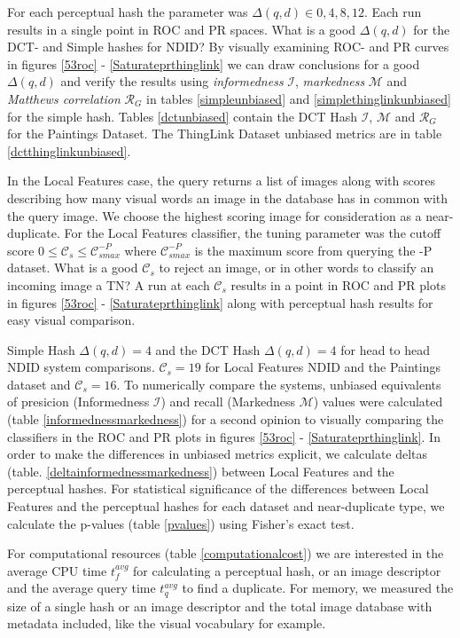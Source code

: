 \documentclass[english,12pt,a4paper,pdftex,elec,utf8, table]{aaltothesis}
\begin{document}
For each perceptual hash the parameter was $\Delta(q,d) \in {0,4,8,12}$. Each run results in a single point in ROC and PR spaces. What is a good $\Delta(q,d)$ for the DCT- and Simple hashes for NDID? By visually examining ROC- and PR curves in figures \ref{53roc} - \ref{Saturateprthinglink} we can draw conclusions for a good $\Delta(q,d)$ and verify the results using \emph{informedness} $\mathcal{I}$, \emph{markedness} $\mathcal{M}$ and \emph{Matthews correlation} $\mathcal{R}_G$ in tables \ref{simpleunbiased} and \ref{simplethinglinkunbiased} for the simple hash. Tables \ref{dctunbiased} contain the DCT Hash $\mathcal{I}$, $\mathcal{M}$ and $\mathcal{R}_G$ for the Paintings Dataset. The ThingLink Dataset unbiased metrics are in table \ref{dctthinglinkunbiased}.

In the Local Features case, the query returns a list of images along with scores describing how many visual words an image in the database has in common with the query image. We choose the highest scoring image for consideration as a near-duplicate.
For the Local Features classifier, the tuning parameter was the cutoff score $0 \leq \mathcal{C}_s \leq \mathcal{C}_{smax}^{-P}$ where $\mathcal{C}_{smax}^{-P}$ is the maximum score from querying the -P dataset. What is a good $\mathcal{C}_s$ to reject an image, or in other words to classify an incoming image a TN?  A run at each $\mathcal{C}_s$ results in a point in ROC and PR plots in figures \ref{53roc} - \ref{Saturateprthinglink} along with perceptual hash results for easy visual comparison.

Simple Hash $\Delta(q,d)=4$ and the DCT Hash $\Delta(q,d)=4$ for head to head NDID system comparisons. $\mathcal{C}_s=19$ for Local Features NDID and the Paintings dataset and $\mathcal{C}_s=16$. To numerically compare the systems, unbiased equivalents of presicion (Informedness $\mathcal{I}$) and recall (Markedness $\mathcal{M}$) values were calculated (table \ref{informednessmarkedness}) for a second opinion to visually comparing the classifiers in the ROC and PR plots in figures \ref{53roc} - \ref{Saturateprthinglink}. In order to make the differences in unbiased metrics explicit, we calculate deltas (table. \ref{deltainformednessmarkedness}) between Local Features and the perceptual hashes. For statistical significance of the differences between Local Features and the perceptual hashes for each dataset and near-duplicate type, we calculate the p-values (table \ref{pvalues}) using Fisher's exact test.

For computational resources (table \ref{computationalcost}) we are interested in the average CPU time $t_f^{avg}$ for calculating a perceptual hash, or an image descriptor and the average query time $t_q^{avg}$ to find a duplicate. For memory, we measured the size of a single hash or an image descriptor and the total image database with metadata included, like the visual vocabulary for example.
\end{document}
